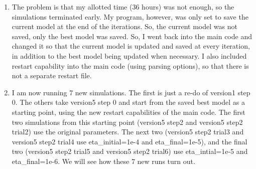 \documentclass[12pt,reqno]{amsart}
\numberwithin{equation}{section}
\begin{document}
\begin{enumerate}
\item The problem is that my allotted time (36 hours) was not enough, so the simulations terminated early.  My program, however, was only set to save the current model at the end of the iterations.  So, the current model was not saved, only the best model was saved.  So, I went back into the main code and changed it so that the current model is updated and saved at every iteration, in addition to the best model being updated when necessary.  I also included restart capability into the main code (using parsing options), so that there is not a separate restart file.  

\item I am now running 7 new simulations.  The first is just a re-do of version1 step 0.  The others take version5 step 0 and start from the saved best model as a starting point, using the new restart capabilities of the main code.  The first two simulations from this starting point (version5 step2 and version5 step2 trial2) use the original parameters.  The next two (version5 step2 trial3 and version5 step2 trial4 use eta\_initial=1e-4 and eta\_final=1e-5), and the final two (version5 step2 trial5 and version5 step2 trial6) use eta\_intial=1e-5 and eta\_final=1e-6.  We will see how these 7 new runs turn out.  
\end{enumerate}
\end{document}
